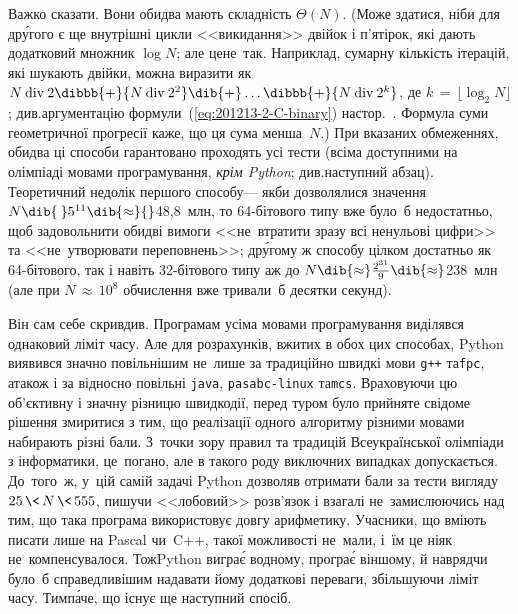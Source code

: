  Важко сказати. Вони обидва мають складність $\Theta(N)$. (\mbox{Може} здатися, ніби для др\'{у}гого %
є ще внутрішні цикли <<викидання>> двійок і п'ятірок, які дають додатковий множник $\log{}N$; але %
це\nolinebreak[3] не~так. Наприклад, сумарну кількість ітерацій, які шукають двійки, можна виразити як 
${N\mathbin{\mathrm{div}}2}\dibbb{{+}}
{N\mathbin{\mathrm{div}}2^2}\dib{{+}}
\dots\dibbb{{+}}
{N\mathbin{\mathrm{div}}2^k}$,
де ${k\,{=}\,\lfloor\log_2{N}\rfloor}$;
див.\nolinebreak[2] аргументацію формули~(\ref{eq:201213-2-C-binary}) на\nolinebreak[2] стор.~\pageref{eq:201213-2-C-binary}. Формула суми геометричної прогресії каже, що ця сума менша~$N$.)
При вказаних обмеженнях, обидва ці способи гарантовано проходять усі тести (всіма доступними на олімпіаді мовами програмування, \emph{крім Python}; див.\nolinebreak[3] наступний абзац). Теоретичний недолік першого способу\nolinebreak[3] --- якби дозволялися значення $N\dib{{\>}}5^{11}\dib{{\approx}}{}$48,8~млн, то \mbox{64-бі}\-то\-вого типу вже було~б недостатньо, щоб задовольнити обидві вимоги <<не~втратити зразу всі ненульові цифри>> та <<не~утворювати переповнень>>; др\'{у}гому ж способу цілком достатньо як \mbox{64-бі}\-то\-вого, так і навіть \mbox{32-бі}\-то\-вого типу аж до $N\dib{{\approx}}\frac{2^{31}}{9}\dib{{\approx}}$238~млн (але при ${N\,{\approx}\,10^8}$ обчислення вже тривали~б десятки секунд).

Він сам себе скривдив.
Програмам усіма мовами програмування виділявся однаковий ліміт часу.
Але для розрахунків, вжитих в обох цих способах, Python виявився значно повільнішим не~лише за традиційно швидкі мови \verb"g++" та\nolinebreak[3] \verb"fpc", а\nolinebreak[3] також і за відносно повільні \verb"java", \verb"pasabc-"\nolinebreak[3]\verb"linux" та\nolinebreak[3] \verb"mcs". Враховуючи цю об'єктивну і значну різницю швидкодії, перед туром було прийняте свідоме рішення змиритися з тим, що реалізації одного алгоритму різними мовами набирають різні бали. З~точки зору правил та традицій Всеукраїнської олімпіади з інформатики, це~погано, але в такого роду виключних випадках допускається. До~того~ж, у~цій самій задачі Python дозволяв отримати бали за тести вигляду $25\,{\<}\,N\,{\<}\,555$, пишучи <<лобовий>> розв'язок і взагалі не~замислюючись над тим, що така програма використовує довгу арифметику. Учасники, що вміють писати лише на Pascal чи~C++, такої можливості не~мали, і~їм це ніяк не~компенсувалося. Тож\nolinebreak[2] Python вигра\'{є} в\nolinebreak[3] одному, програ\'{є} в\nolinebreak[3] іншому, й навряд\nolinebreak[3] чи було~б справедливішим надавати йому додаткові переваги, збільшуючи ліміт часу. Тим\nolinebreak[3] п\'{а}че, що існує ще наступний спосіб.

